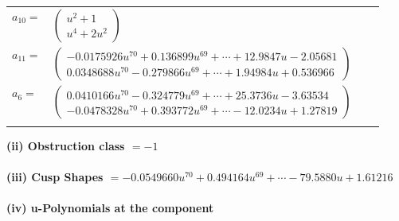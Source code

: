\documentclass[1p]{elsarticle_modified}
\theoremstyle{definition}
\begin{document}
\begin{tabular}{m{7pt} m{180pt} m{7pt} m{180pt} }
\flushright $a_{10}=$&$\begin{pmatrix}u^2+1\\u^4+2 u^2\end{pmatrix}$ \\
\flushright $a_{11}=$&$\begin{pmatrix}-0.0175926 u^{70}+0.136899 u^{69}+\cdots+12.9847 u-2.05681\\0.0348688 u^{70}-0.279866 u^{69}+\cdots+1.94984 u+0.536966\end{pmatrix}$ \\
\flushright $a_{6}=$&$\begin{pmatrix}0.0410166 u^{70}-0.324779 u^{69}+\cdots+25.3736 u-3.63534\\-0.0478328 u^{70}+0.393772 u^{69}+\cdots-12.0234 u+1.27819\end{pmatrix}$\\&\end{tabular}
\flushleft \textbf{(ii) Obstruction class $= -1$}\\~\\
\flushleft \textbf{(iii) Cusp Shapes $= -0.0549660 u^{70}+0.494164 u^{69}+\cdots-79.5880 u+1.61216$}\\~\\
\newpage\renewcommand{\arraystretch}{1}
\flushleft \textbf{(iv) u-Polynomials at the component}\newline \\
\end{document}
